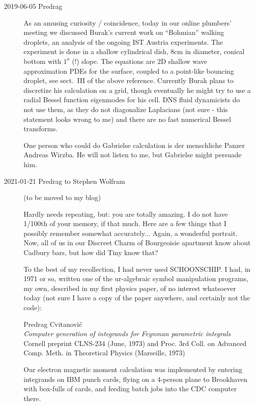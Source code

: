 \begin{description}
\item[2019-06-05 Predrag]
As an amusing curiosity / coincidence, today in our online plumbers'
meeting we discussed Burak's current work on ``Bohmian'' walking
droplets, an analysis of the ongoing IST Austria
experiments. The experiment is done in a shallow cylindrical dish, 8cm in
diameter, conical bottom with $1^o$ (!) slope. The equations are 2D
shallow wave approximation PDEs for the surface, coupled to a point-like
bouncing droplet, see sect.~III of the above reference. Currently Burak
plans to discretize his calculation on a grid, though eventually he might
try to use a radial Bessel function eigenmodes for his cell. DNS fluid
dynamicists do not use them, as they do not diagonalize Laplacians (not
sure - this statement looks wrong to me) and there are no fast numerical
Bessel transforms.

One person who could do Gabrielse calculation is der menschliche Panzer
Andreas Wirzba. He will not listen to me, but Gabrielse
might persuade him.

\item[2021-01-21 Predrag to Stephen Wolfram]
(to be moved to my
 {blog})

Hardly needs repeating, but: you are totally amazing. I do not have 1/100th of your memory, if that much. Here are a few things that I possibly remember somewhat accurately... Again, a wonderful portrait. Now, all of us in our Discreet Charm of Bourgeoisie apartment know about Cadbury bars, but how did Tiny know that?

To the best of my recollection, I had never used SCHOONSCHIP. I had, in 1971
or so, written one of the ur-algebraic symbol manipulation programs, my own,
described in my
{first physics paper}, of no interest whatsoever today (not
sure I have a copy of the paper anywhere, and certainly not the code):

Predrag Cvitanovi\'c\\
{\em Computer generation of integrands for Feynman parametric integrals}\\
Cornell preprint CLNS-234 (June, 1973)
and Proc. 3rd Coll. on Advanced Comp. Meth. in Theoretical Physics
(Marseille, 1973)

Our electron magnetic moment calculation was implemented by entering integrands on IBM punch cards, flying on a 4-person plane to Brookhaven with box-fulls of cards, and feeding batch jobs into the CDC computer there.


\end{description}
